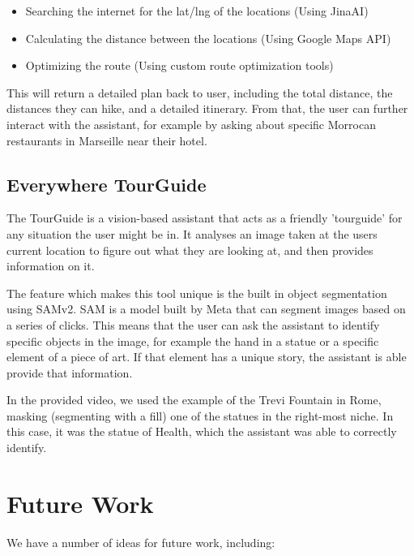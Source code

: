 \documentclass{article}
\begin{document}
\begin{itemize}
\item Searching the internet for the lat/lng of the locations (Using JinaAI)
\item Calculating the distance between the locations (Using Google Maps API)
\item Optimizing the route (Using custom route optimization tools)
\end{itemize}

This will return a detailed plan back to user, including the total distance, the distances they can hike, and a detailed itinerary. From that, the user can further interact with the assistant, for example by asking about specific Morrocan restaurants in Marseille near their hotel.

\subsection{Everywhere TourGuide}

The TourGuide is a vision-based assistant that acts as a friendly 'tourguide' for any situation the user might be in. It analyses an image taken at the users current location to figure out what they are looking at, and then provides information on it.

The feature which makes this tool unique is the built in object segmentation using SAMv2. SAM is a model built by Meta that can segment images based on a series of clicks. This means that the user can ask the assistant to identify specific objects in the image, for example the hand in a statue or a specific element of a piece of art. If that element has a unique story, the assistant is able provide that information.

In the provided video, we used the example of the Trevi Fountain in Rome, masking (segmenting with a fill) one of the statues in the right-most niche. In this case, it was the statue of Health, which the assistant was able to correctly identify.

\section{Future Work}

We have a number of ideas for future work, including:
\end{document}
